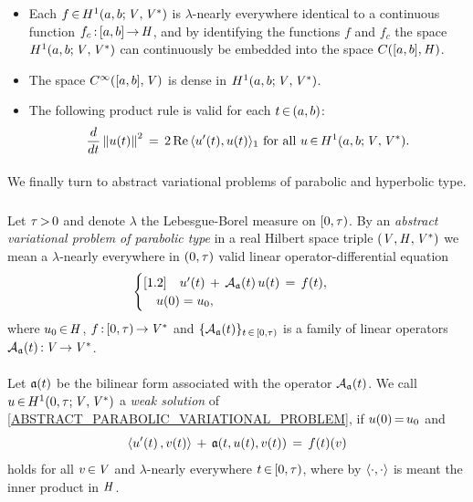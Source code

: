 \documentclass[11pt,twoside]{article}
\begin{document}
\begin{itemize}[leftmargin=9mm]
\item[(a)]
Each $f {\,\in\,} H^1(a,b;\mathit{V},\mathit{V}^*)$
is $\lambda$-nearly everywhere identical
to a continuous function $f_c {\,:\,} [a,b] {\,\to\,} \mathit{H}$,
and by identifying the functions $f$ and $f_c$
the space $H^1(a,b;\mathit{V},\mathit{V}^*)$ can continuously be embedded
into the space $C([a,b],\mathit{H})$.

\item[(b)]
The space $C^{\infty}([a,b],\mathit{V})$ is dense in $H^1(a,b;\mathit{V},\mathit{V}^*)$.

\item[(c)]
The following product rule is valid for each $t {\,\in\,} (a,b)$:
\[
\frac{d}{dt} \left\lVert u(t) \right\rVert ^2
\,=\,
2 \operatorname{Re} \, \langle u'(t),u(t) \rangle_1
\mbox{ for all } u {\,\in\,} H^1(a,b;\mathit{V},\mathit{V}^*).
\]
\end{itemize}

\paragraph{} %
We finally turn to abstract variational problems
of parabolic and hyperbolic type.

\subparagraph{}
Let $\tau {\,>\,} 0$ and denote $\lambda$ the Lebesgue-Borel measure on $[0,\tau)$.
By an \textit{abstract variational problem of parabolic type}
in a real Hilbert space triple $(\mathit{V},\mathit{H},\mathit{V}^*)$
we mean a $\lambda$-nearly everywhere in $(0,\tau)$ valid
linear operator-differential equation
\begin{equation}\label{ABSTRACT_PARABOLIC_VARIATIONAL_PROBLEM}
\begin{cases}[1.2]
\quad u'(t) \,+\, {{\mathcal{A}}_{\mathfrak{a}}}(t) \, u(t) \,=\, f(t), \\
\quad u(0) = u_0, \\
\end{cases}
\end{equation}
where $u_0 {\,\in\,} \mathit{H}$,
$f {\,:\,} [0,\tau) {\,\to\,} \mathit{V}^*$ and $\{{{\mathcal{A}}_{\mathfrak{a}}}(t)\}_{t {\,\in\,} [0,\tau)}$
is a family of linear operators ${{\mathcal{A}}_{\mathfrak{a}}}(t) {\,:\,} \mathit{V} {\,\to\,} \mathit{V}^*$.

\paragraph{} %
Let $\mathfrak{a}(t)$ be the bilinear form associated with the operator ${{\mathcal{A}}_{\mathfrak{a}}}(t)$.
We call $u {\,\in\,} H^1(0,\tau;\mathit{V},\mathit{V}^*)$
a \textit{weak solution} of \eqref{ABSTRACT_PARABOLIC_VARIATIONAL_PROBLEM},
if $u(0) {\,=\,} u_0$ and
\[
\langle u'(t)\,,v(t) \rangle \,+\, \mathfrak{a}(t,u(t),v(t)) \,=\, f(t)(v)
\]
holds for all $v {\,\in\,} \mathit{V}$ and $\lambda$-nearly everywhere $t {\,\in\,} [0,\tau)$,
where by $\langle \cdot,\cdot \rangle$ is meant the inner product in $\mathit{H}$.
\end{document}
